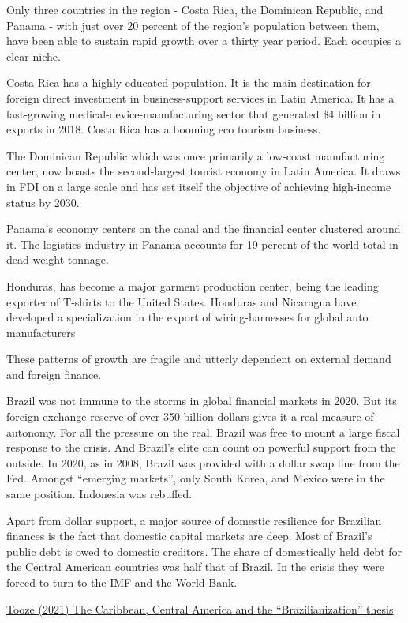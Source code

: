 \documentclass[
]{book}
\begin{document}
Only three countries in the region - Costa Rica, the Dominican Republic, and Panama - with just over 20 percent of the region's population between them, have been able to sustain rapid growth over a thirty year period. Each occupies a clear niche.

Costa Rica has a highly educated population. It is the main destination for foreign direct investment in business-support services in Latin America. It has a fast-growing medical-device-manufacturing sector that generated \$4 billion in exports in 2018. Costa Rica has a booming eco tourism business.

The Dominican Republic which was once primarily a low-coast manufacturing center, now boasts the second-largest tourist economy in Latin America. It draws in FDI on a large scale and has set itself the objective of achieving high-income status by 2030.

Panama's economy centers on the canal and the financial center clustered around it. The logistics industry in Panama accounts for 19 percent of the world total in dead-weight tonnage.

Honduras, has become a major garment production center, being the leading exporter of T-shirts to the United States. Honduras and Nicaragua have developed a specialization in the export of wiring-harnesses for global auto manufacturers

These patterns of growth are fragile and utterly dependent on external demand and foreign finance.

Brazil was not immune to the storms in global financial markets in 2020. But its foreign exchange reserve of over 350 billion dollars gives it a real measure of autonomy. For all the pressure on the real, Brazil was free to mount a large fiscal response to the crisis. And Brazil's elite can count on powerful support from the outside. In 2020, as in 2008, Brazil was provided with a dollar swap line from the Fed. Amongst ``emerging markets'', only South Korea, and Mexico were in the same position. Indonesia was rebuffed.

Apart from dollar support, a major source of domestic resilience for Brazilian finances is the fact that domestic capital markets are deep. Most of Brazil's public debt is owed to domestic creditors. The share of domestically held debt for the Central American countries was half that of Brazil. In the crisis they were forced to turn to the IMF and the World Bank.

\href{https://adamtooze.substack.com/p/chartbook-newsletter-20}{Tooze (2021) The Caribbean, Central America and the ``Brazilianization'' thesis}
\end{document}
